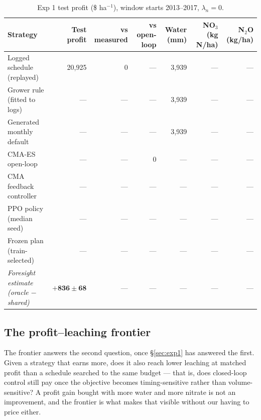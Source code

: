 \documentclass[a4paper,fleqn]{cas-sc}
\begin{document}
\begin{table}[t]
\caption{Exp 1 test profit (\$ ha$^{-1}$), window starts 2013--2017,
$\lambda_n = 0$.}\label{tbl:exp1}
\begin{tabular*}{\tblwidth}{@{}LRRRRRR@{}}
\toprule
Strategy & Test profit & vs measured & vs open-loop & Water (mm) & NO$_3$ (kg N/ha) & N$_2$O (kg/ha) \\
\midrule
Logged schedule (replayed) & 20{,}925 & 0 & --- & 3{,}939 & --- & --- \\
Grower rule (fitted to logs) & --- & --- & --- & 3{,}939 & --- & --- \\
Generated monthly default & --- & --- & --- & 3{,}939 & --- & --- \\
CMA-ES open-loop & --- & --- & 0 & --- & --- & --- \\
CMA feedback controller & --- & --- & --- & --- & --- & --- \\
PPO policy (median seed) & --- & --- & --- & --- & --- & --- \\
Frozen plan (train-selected) & --- & --- & --- & --- & --- & --- \\
\emph{Foresight estimate (oracle $-$ shared)} & $\mathbf{+836 \pm 68}$ & --- & --- & --- & --- & --- \\
\bottomrule
\end{tabular*}
\end{table}


\subsection{The profit--leaching frontier}\label{sec:frontier}


The frontier answers the second question, once \S\ref{sec:exp1} has answered the first.
Given a strategy that earns more, does it also reach lower leaching at matched profit
than a schedule searched to the same budget --- that is, does closed-loop control still
pay once the objective becomes timing-sensitive rather than volume-sensitive? A profit
gain bought with more water and more nitrate is not an improvement, and the frontier is
what makes that visible without our having to price either.
\end{document}
